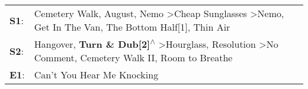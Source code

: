 \begin{supertabular}{p{0.03\textwidth}p{0.92\textwidth}}
 \textbf{S1}:  &  Cemetery Walk\textsuperscript{}, \enspace August\textsuperscript{}, \enspace Nemo\textsuperscript{} \textgreater \enspace Cheap Sunglasses\textsuperscript{} \textgreater \enspace Nemo\textsuperscript{}, \enspace Get In The Van\textsuperscript{}, \enspace The Bottom Half[1]\textsuperscript{}, \enspace Thin Air\textsuperscript{}  \enspace  \\
 \textbf{S2}:  &               Hangover\textsuperscript{}, \enspace \textbf{Turn \& Dub[2]\textsuperscript{$\wedge$}} \textgreater \enspace Hourglass\textsuperscript{}, \enspace Resolution\textsuperscript{} \textgreater \enspace No Comment\textsuperscript{}, \enspace Cemetery Walk II\textsuperscript{}, \enspace Room to Breathe\textsuperscript{}  \enspace  \\
 \textbf{E1}:  &                                                                                                                                                                                                                                                                                              Can't You Hear Me Knocking\textsuperscript{}  \enspace  \\
\end{supertabular}
